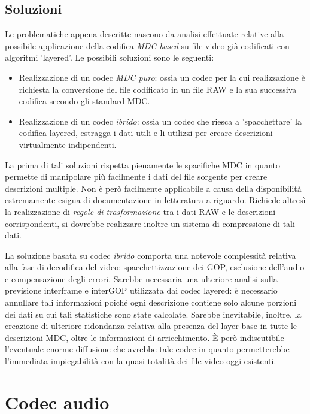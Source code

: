\subsection{Soluzioni}

Le problematiche appena descritte nascono da analisi effettuate relative alla
possibile applicazione della codifica \emph{MDC based} su file video già
codificati con algoritmi 'layered'. Le possibili soluzioni sono le seguenti:

\begin{itemize}
  \item Realizzazione di un codec \emph{MDC puro}: ossia un codec per la cui
  realizzazione è richiesta la conversione del file codificato in un file RAW e
  la sua successiva codifica secondo gli standard MDC.
  \item Realizzazione di un codec \emph{ibrido}: ossia un codec che riesca a
  'spacchettare' la codifica layered, estragga i dati utili e li utilizzi per
  creare descrizioni virtualmente indipendenti.
\end{itemize}

La prima di tali soluzioni rispetta pienamente le spacifiche MDC in quanto
permette di manipolare più facilmente i dati del file sorgente per creare
descrizioni multiple. Non è però facilmente applicabile a causa della
disponibilità estremamente esigua di documentazione in letteratura a riguardo. Richiede
altresì la realizzazione di \emph{regole di trasformazione} tra i dati RAW e le
descrizioni corrispondenti, si dovrebbe realizzare inoltre un sistema di
compressione di tali dati.

La soluzione basata su codec \emph{ibrido} comporta una notevole complessità
relativa alla fase di decodifica del video: spacchettizzazione dei GOP,
esclusione dell'audio e compensazione degli errori. Sarebbe necessaria una
ulteriore analisi sulla previsione interframe e interGOP utilizzata dai codec
layered: è necessario annullare tali informazioni poiché ogni descrizione
contiene solo alcune porzioni dei dati su cui tali statistiche sono state calcolate.
Sarebbe inevitabile, inoltre, la creazione di ulteriore ridondanza relativa
alla presenza del layer base in tutte le descrizioni MDC, oltre le informazioni
di arricchimento. \`E però indiscutibile l'eventuale enorme diffusione che avrebbe
tale codec in quanto permetterebbe l'immediata impiegabilità con la quasi totalità dei file video oggi esistenti.

\section{Codec audio}

